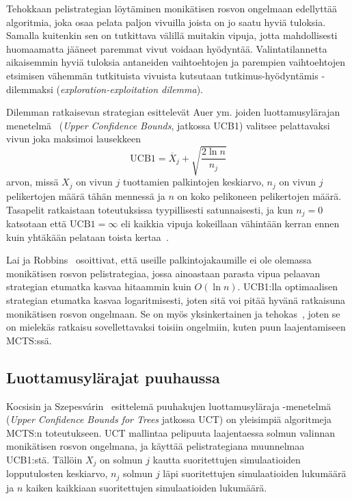 \documentclass[12pt,finnish]{tktltiki2}
\theoremstyle{definition}
\theoremstyle{remark}
\begin{document}
Tehokkaan pelistrategian löytäminen monikätisen rosvon ongelmaan edellyttää algoritmia, joka osaa pelata paljon vivuilla joista on jo saatu hyviä tuloksia. Samalla kuitenkin sen on tutkittava välillä muitakin vipuja, jotta mahdollisesti huomaamatta jääneet paremmat vivut voidaan hyödyntää. Valintatilannetta aikaisemmin hyviä tuloksia antaneiden vaihtoehtojen ja parempien vaihtoehtojen etsimisen vähemmän tutkituista vivuista kutsutaan tutkimus-hyödyntämis -dilemmaksi (\textit{exploration-exploitation dilemma}).

Dilemman ratkaisevan strategian esittelevät Auer ym. joiden luottamusylärajan menetelmä~\cite{auer} (\textit{Upper Confidence Bounds}, jatkossa UCB1) valitsee pelattavaksi vivun joka maksimoi lausekkeen
\begin{equation}
\text{UCB1} = \overline{X}_j + \sqrt{\frac{2 \ln n}{n_j}}
\end{equation}
arvon, missä $X_j$ on vivun $j$ tuottamien palkintojen keskiarvo, $n_j$ on vivun $j$ pelikertojen määrä tähän mennessä ja $n$ on koko pelikoneen pelikertojen määrä. Tasapelit ratkaistaan toteutuksissa tyypillisesti satunnaisesti, ja kun $n_j = 0$ katsotaan että $\text{UCB1} = \infty$ eli kaikkia vipuja kokeillaan vähintään kerran ennen kuin yhtäkään pelataan toista kertaa~\cite{browne}.

Lai ja Robbins~\cite{lai} osoittivat, että useille palkintojakaumille ei ole olemassa monikätisen rosvon pelistrategiaa, jossa ainoastaan parasta vipua pelaavan strategian etumatka kasvaa hitaammin kuin $O(\ln n)$. UCB1:lla optimaalisen strategian etumatka kasvaa logaritmisesti, joten sitä voi pitää hyvänä ratkaisuna monikätisen rosvon ongelmaan. Se on myös yksinkertainen ja tehokas~\cite{browne}, joten se on mielekäs ratkaisu sovellettavaksi toisiin ongelmiin, kuten puun laajentamiseen MCTS:ssä.

\subsection{Luottamusylärajat puuhaussa}

Kocsisin ja Szepesvárin~\cite{kocsis} esittelemä puuhakujen luottamusyläraja -menetelmä (\textit{Upper Confidence Bounds for Trees} jatkossa UCT) on yleisimpiä algoritmeja MCTS:n toteutukseen. UCT mallintaa pelipuuta laajentaessa solmun valinnan monikätisen rosvon ongelmana, ja käyttää pelistrategiana muunnelmaa UCB1:stä. Tällöin $X_j$ on solmun $j$ kautta suoritettujen simulaatioiden lopputulosten keskiarvo, $n_j$ solmun $j$ läpi suoritettujen simulaatioiden lukumäärä ja $n$ kaiken kaikkiaan suoritettujen simulaatioiden lukumäärä.
\end{document}
